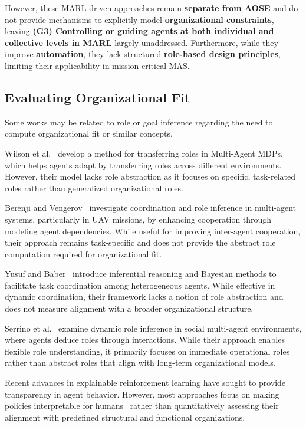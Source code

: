\documentclass[pdflatex,sn-mathphys-num]{sn-jnl}%
\theoremstyle{thmstyleone}%
\theoremstyle{thmstyletwo}%
\theoremstyle{thmstylethree}%
\begin{document}
However, these MARL-driven approaches remain \textbf{separate from AOSE} and do not provide mechanisms to explicitly model \textbf{organizational constraints}, leaving \textbf{(G3) Controlling or guiding agents at both individual and collective levels in MARL} largely unaddressed. Furthermore, while they improve \textbf{automation}, they lack structured \textbf{role-based design principles}, limiting their applicability in mission-critical MAS.

\subsection{Evaluating Organizational Fit}

Some works may be related to role or goal inference regarding the need to compute organizational fit or similar concepts.

Wilson et al.~\cite{wilson2008learning} develop a method for transferring roles in Multi-Agent MDPs, which helps agents adapt by transferring roles across different environments. However, their model lacks role abstraction as it focuses on specific, task-related roles rather than generalized organizational roles.

Berenji and Vengerov~\cite{berenji2000learning} investigate coordination and role inference in multi-agent systems, particularly in UAV missions, by enhancing cooperation through modeling agent dependencies. While useful for improving inter-agent cooperation, their approach remains task-specific and does not provide the abstract role computation required for organizational fit.

Yusuf and Baber~\cite{yusuf2020inferential} introduce inferential reasoning and Bayesian methods to facilitate task coordination among heterogeneous agents. While effective in dynamic coordination, their framework lacks a notion of role abstraction and does not measure alignment with a broader organizational structure.

Serrino et al.~\cite{serrino2019finding} examine dynamic role inference in social multi-agent environments, where agents deduce roles through interactions. While their approach enables flexible role understanding, it primarily focuses on immediate operational roles rather than abstract roles that align with long-term organizational models.

Recent advances in explainable reinforcement learning have sought to provide transparency in agent behavior. However, most approaches focus on making policies interpretable for humans~\cite{van2018explainable} rather than quantitatively assessing their alignment with predefined structural and functional organizations.
\end{document}

